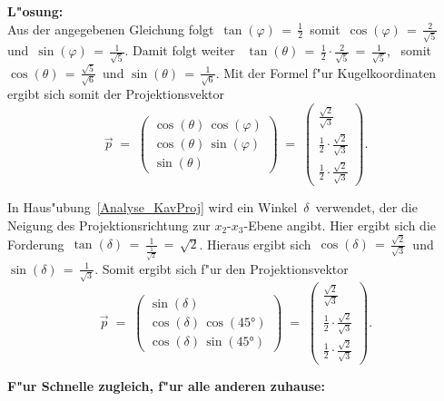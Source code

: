 \begin{Aufgabe}
\textbf{L"osung:}\\
Aus der angegebenen Gleichung folgt\, $\tan(\varphi)\, =\, \tfrac{1}{2}$\, somit\, $\cos(\varphi)\, =\, \tfrac{2}{\sqrt{5}}$\, und\, $\sin(\varphi)\, =\, \tfrac{1}{\sqrt{5}}$. Damit folgt weiter \, $\tan(\theta)\, =\, \tfrac{1}{2}\cdot \tfrac{2}{\sqrt{5}}\, =\, \tfrac{1}{\sqrt{5}}$, \, somit\, $\cos(\theta)\, =\, \tfrac{\sqrt{5}}{\sqrt{6}}$\, und $\sin(\theta)\, =\, \tfrac{1}{\sqrt{6}}$. Mit der Formel f"ur Kugelkoordinaten ergibt sich somit der Projektionsvektor \[\vec{p}\; =\; \begin{pmatrix} \cos(\theta)\, \cos(\varphi)\\  \cos(\theta)\, \sin(\varphi)\\ \sin(\theta)\end{pmatrix}\;= \; \begin{pmatrix} \tfrac{\sqrt{2}}{\sqrt{3}}\\  \tfrac{1}{2} \cdot \tfrac{\sqrt{2}}{\sqrt{3}}\\ \tfrac{1}{2} \cdot \tfrac{\sqrt{2}}{\sqrt{3}}\end{pmatrix}. \]

In Haus"ubung~\ref{Analyse_KavProj} wird ein Winkel\, $\delta$\, verwendet, der die Neigung des Projektionsrichtung zur $x_2$-$x_3$-Ebene angibt.
Hier ergibt sich die Forderung\, $\tan(\delta)\, =\, \frac{1}{\tfrac{1}{\sqrt{2}}}\, =\, \sqrt{2}$. Hieraus ergibt sich\, $\cos(\delta)\, =\, \tfrac{\sqrt{2}}{\sqrt{3}}$\, und\, $\sin(\delta)\,= \, \tfrac{1}{\sqrt{3}}$. Somit ergibt sich f"ur den Projektionsvektor
\[\vec{p}\; =\; \begin{pmatrix} \sin(\delta)\\  \cos(\delta)\, \cos\left(\ang{45}\right)\\ \cos(\delta)\, \sin\left(\ang{45}\right)\end{pmatrix}\;= \; \begin{pmatrix} \tfrac{\sqrt{2}}{\sqrt{3}}\\  \tfrac{1}{2} \cdot \tfrac{\sqrt{2}}{\sqrt{3}}\\ \tfrac{1}{2} \cdot \tfrac{\sqrt{2}}{\sqrt{3}}\end{pmatrix}. \]
\end{Aufgabe}
%
\small
\textbf{F"ur Schnelle zugleich, f"ur alle anderen zuhause:}
